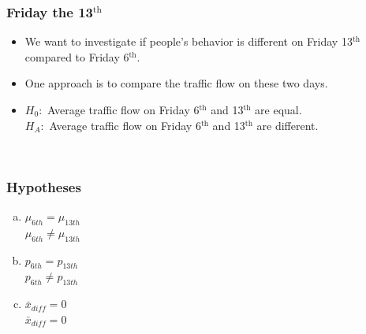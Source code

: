 \documentclass[notes,11pt, aspectratio=169]{beamer}
\begin{document}
\begin{frame}
\frametitle{Friday the 13$^{\text{th}}$}

\begin{itemize}

\item We want to investigate if people's behavior is different on Friday 13$^{\text{th}}$ compared to Friday 6$^{\text{th}}$.

\pause

\item One approach is to compare the traffic flow on these two days.

\pause

\item $H_0:$ Average traffic flow on Friday 6$^{\text{th}}$ and 13$^{\text{th}}$ are equal. \\
$H_A:$ Average traffic flow on Friday 6$^{\text{th}}$ and 13$^{\text{th}}$ are different.

\pause

\end{itemize}

$\:$ \\



\end{frame}


\begin{frame}
\frametitle{Hypotheses}


\begin{enumerate}[(a)]
\item  {} $\mu_{6th} = \mu_{13th}$ \\
 $\mu_{6th} \ne \mu_{13th}$
\item  {} $p_{6th} = p_{13th}$ \\
 $p_{6th} \ne p_{13th}$
\item  {} $\bar{x}_{diff} = 0$ \\
 $\bar{x}_{diff} = 0$
\end{enumerate}

\end{frame}
\end{document}
